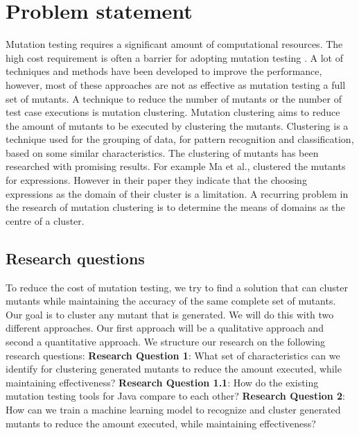 \documentclass[../main]{subfiles}
\begin{document}
\section{Problem statement}
Mutation testing requires a significant amount of computational resources\cite{Kintis2016EffectiveMutation}. 
The high cost requirement is often a barrier for adopting mutation testing \cite{Pizzoleto2019}.
A lot of techniques and methods have been developed to improve the performance, however, most of these approaches are not as effective as mutation testing a full set of mutants\cite{Pizzoleto2019,Yao2014}. 
\newline
A technique to reduce the number of mutants or the number of test case executions is mutation clustering.
Mutation clustering aims to reduce the amount of mutants to be executed by clustering the mutants\cite{Ma2016,Yu2019PossibilityScope}.
Clustering is a technique used for the grouping of data, for pattern recognition and classification, based on some similar characteristics\cite{Alsabti1997}.
The clustering of mutants has been researched with promising results\cite{Ji2009,Wilinski2015,Ma2016}. For example Ma et al., \cite{Ma2016} clustered the mutants for expressions. 
However in their paper they indicate that the choosing expressions as the domain of their cluster is a limitation.
A recurring problem in the research of mutation clustering is to determine the means of domains as the centre of a cluster\cite{Ji2009,Wilinski2015,Ma2016,Wei2021SpectralTesting}.


\subsection{Research questions}
To reduce the cost of mutation testing, we try to find a solution that can cluster mutants while maintaining the accuracy of the same complete set of mutants. 
Our goal is to cluster any mutant that is generated.
We will do this with two different approaches.
Our first approach will be a qualitative approach and second a quantitative approach. 
We structure our research on the following research questions:
\newline
\textbf{Research Question 1}: What set of characteristics can we identify for clustering generated mutants to reduce the amount executed, while maintaining effectiveness?
\newline
\textbf{Research Question 1.1}: How do the existing mutation testing tools for Java compare to each other?
\newline
\textbf{Research Question 2}: How can we train a machine learning model to recognize and cluster generated mutants to reduce the amount executed, while maintaining effectiveness?
\end{document}

